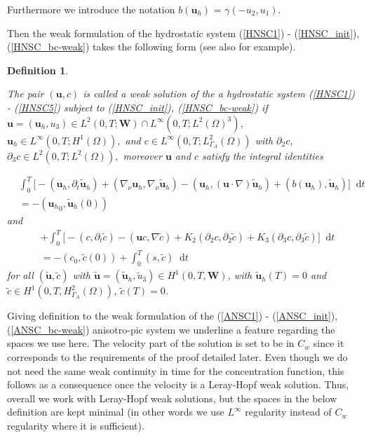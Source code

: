 \documentclass[11pt]{article}
\newtheorem{definition}{Definition}
\newcommand*\diff{\mathop{}\!\mathrm{d}}
\begin{document}
Furthermore we introduce the notation $b(\mathbf{u}_h)$ = $\gamma ( - u_2 , u_1).$

Then the weak formulation of the hydrostatic system (\ref{HNSC1}) - (\ref{HNSC_init}), (\ref{HNSC_bc-weak}) takes the following form (see also \cite{cao2007global} for example).

\begin{definition} \label{definitionhydrostaticWF}

The pair $(\mathbf{u}, c)$ is called a weak solution of the a hydrostatic system (\ref{HNSC1}) - (\ref{HNSC5}) subject to (\ref{HNSC_init}), (\ref{HNSC_bc-weak}) if $\mathbf{u} = (\mathbf{u}_h, u_3) \in L^2 (0, T; \mathbf{W}) \cap L^\infty (0,T; L^2(\Omega)^3),$ $\mathbf{u}_h \in L^\infty(0,T; H^1(\Omega)),$ and $c \in L^\infty (0, T; L_{\Gamma_A}^2(\Omega))$ with $\partial_2 c$, $\partial_3 c \in L^2(0, T; L^2(\Omega)),$ moreover $\mathbf{u}$ and $c$ satisfy the integral identities

\begin{equation}
\begin{split}
& \int_0^T \bigg[ -(\mathbf{u}_h, \partial_t \mathbf{\tilde{u}}_h) + (\nabla_\nu \mathbf{u}_h, \nabla_\nu \mathbf{\tilde{u}}_h) - (\mathbf{u}_h, (\mathbf{u} \cdot \nabla) \mathbf{\tilde{u}}_h) + (b(\mathbf{u}_h), \mathbf{\tilde{u}}_h) \bigg ] \diff t \\
& = - ({\mathbf{u}_h}_0, \mathbf{\tilde{u}}_h(0)) \label{hydrostaticWF}
\end{split}
\end{equation}
%
and
%
\begin{equation}
\begin{split} \nonumber
&+ \int_0^T \bigg[ -(c, \partial_t \tilde{c}) -(\mathbf{u}c, \nabla \tilde{c}) + K_2 (\partial_2 c, \partial_2 \tilde{c}) + K_3 (\partial_3 c, \partial_3 \tilde{c}) \bigg ] \diff t \\
& = - (c_0, \tilde{c}(0)) + \int_0^T (s,\tilde{c}) \diff t
\end{split}
\end{equation}
%
for all $(\mathbf{\tilde{u}}, \tilde{c})$ with $\mathbf{\tilde{u}} = (\mathbf{\tilde{u}}_h, \tilde{u}_3) \in H^1 (0,T, \mathbf{W})$, with $\mathbf{\tilde{u}}_h (T) = 0$ and $\tilde{c} \in H^1 (0,T, H^2_{\Gamma_A} (\Omega))$, $\tilde{c} (T) = 0$.

\end{definition}

Giving definition to the weak formulation of the (\ref{ANSC1}) - (\ref{ANSC_init}), (\ref{ANSC_bc-weak}) anisotro-pic system we underline a feature regarding the spaces we use here. The velocity part of the solution is set to be in $C_w$ since it corresponds to the requirements of the proof detailed later. Even though we do not need the same weak continuity in time for the concentration function, this follows as a consequence once the velocity is a Leray-Hopf weak solution. Thus, overall we work with Leray-Hopf weak solutions, but the spaces in the below definition are kept minimal (in other words we use $L^\infty$ regularity instead of $C_w$ regularity where it is sufficient).
\end{document}
